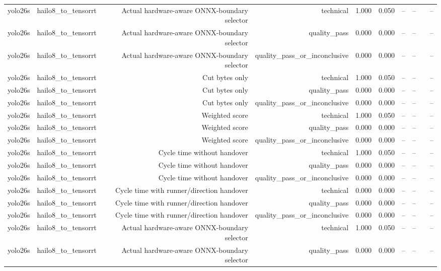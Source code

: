 \begin{table}[t]
\begin{tabular}{lrrrrrrrrr}
yolo26s & hailo8\_to\_tensorrt & Actual hardware-aware ONNX-boundary selector & technical & 1.000 & 0.050 & -- & -- &  & -- \\
yolo26s & hailo8\_to\_tensorrt & Actual hardware-aware ONNX-boundary selector & quality\_pass & 0.000 & 0.000 & -- & -- &  & -- \\
yolo26s & hailo8\_to\_tensorrt & Actual hardware-aware ONNX-boundary selector & quality\_pass\_or\_inconclusive & 0.000 & 0.000 & -- & -- &  & -- \\
yolo26s & hailo8\_to\_tensorrt & Cut bytes only & technical & 1.000 & 0.050 & -- & -- &  & -- \\
yolo26s & hailo8\_to\_tensorrt & Cut bytes only & quality\_pass & 0.000 & 0.000 & -- & -- &  & -- \\
yolo26s & hailo8\_to\_tensorrt & Cut bytes only & quality\_pass\_or\_inconclusive & 0.000 & 0.000 & -- & -- &  & -- \\
yolo26s & hailo8\_to\_tensorrt & Weighted score & technical & 1.000 & 0.050 & -- & -- &  & -- \\
yolo26s & hailo8\_to\_tensorrt & Weighted score & quality\_pass & 0.000 & 0.000 & -- & -- &  & -- \\
yolo26s & hailo8\_to\_tensorrt & Weighted score & quality\_pass\_or\_inconclusive & 0.000 & 0.000 & -- & -- &  & -- \\
yolo26s & hailo8\_to\_tensorrt & Cycle time without handover & technical & 1.000 & 0.050 & -- & -- &  & -- \\
yolo26s & hailo8\_to\_tensorrt & Cycle time without handover & quality\_pass & 0.000 & 0.000 & -- & -- &  & -- \\
yolo26s & hailo8\_to\_tensorrt & Cycle time without handover & quality\_pass\_or\_inconclusive & 0.000 & 0.000 & -- & -- &  & -- \\
yolo26s & hailo8\_to\_tensorrt & Cycle time with runner/direction handover & technical & 0.000 & 0.000 & -- & -- &  & -- \\
yolo26s & hailo8\_to\_tensorrt & Cycle time with runner/direction handover & quality\_pass & 0.000 & 0.000 & -- & -- &  & -- \\
yolo26s & hailo8\_to\_tensorrt & Cycle time with runner/direction handover & quality\_pass\_or\_inconclusive & 0.000 & 0.000 & -- & -- &  & -- \\
yolo26s & hailo8\_to\_tensorrt & Actual hardware-aware ONNX-boundary selector & technical & 1.000 & 0.050 & -- & -- &  & -- \\
yolo26s & hailo8\_to\_tensorrt & Actual hardware-aware ONNX-boundary selector & quality\_pass & 0.000 & 0.000 & -- & -- &  & -- \\

\end{tabular}
\end{table}
